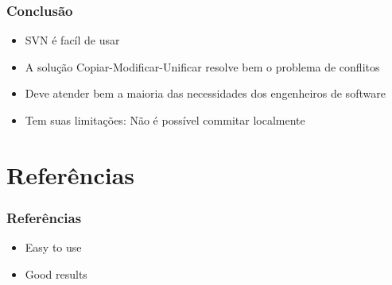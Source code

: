 \documentclass{beamer}
\begin{document}
\begin{frame}
    \frametitle{Conclus\~ao}

    \begin{itemize}
        \item SVN \'e fac\'il de usar
        \item A solu\c{c}\~ao Copiar-Modificar-Unificar resolve bem o problema de conflitos
        \item Deve atender bem a maioria das necessidades dos engenheiros de software
        \item Tem suas limita\c{c}\~oes: N\~ao \'e poss\'ivel commitar localmente
    \end{itemize}
\end{frame}

\section{Refer\^encias}
\begin{frame}
    \frametitle{Refer\^encias}

    \begin{itemize}
        \item Easy to use
        \item Good results
    \end{itemize}
\end{frame}
\end{document}
